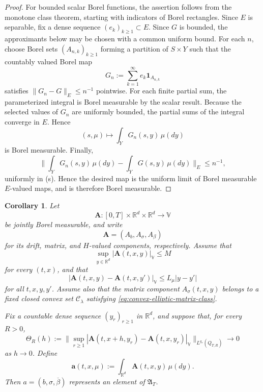 \documentclass[12pt,oneside, reqno]{amsart}
\newtheorem{corollary}[theorem]{Corollary}
\numberwithin{equation}{section}
\begin{document}
	\begin{proof}
		For bounded scalar Borel functions, the assertion follows from the monotone
		class theorem, starting with indicators of Borel rectangles. Since \(E\) is
		separable, fix a dense sequence \((e_k)_{k\geq1}\subset E\). Since \(G\)
		is bounded, the approximants below may be chosen with a common uniform
		bound. For each \(n\), choose Borel sets
		\((A_{n,k})_{k\geq1}\) forming a partition of \(S\times Y\) such that the
		countably valued Borel map
		\[
		G_n:=\sum_{k=1}^{\infty}e_k\mathbf1_{A_{n,k}}
		\]
		satisfies \(\|G_n-G\|_E\leq n^{-1}\) pointwise. For each finite partial
		sum, the parameterized integral is Borel measurable by the scalar result.
		Because the selected values of \(G_n\) are uniformly bounded, the partial
		sums of the integral converge in \(E\). Hence
		\[
		(s,\mu)\longmapsto\int_YG_n(s,y)\,\mu(dy)
		\]
		is Borel measurable. Finally,
		\[
		\big\|
		\int_YG_n(s,y)\,\mu(dy)
		-
		\int_YG(s,y)\,\mu(dy)
		\big\|_E
		\leq n^{-1},
		\]
		uniformly in (s). Hence the desired map is the uniform limit of
		Borel measurable \(E\)-valued maps, and is therefore Borel measurable.
	\end{proof}
	
	\begin{corollary}
		\label{cor:integral-interaction-completion}
		Let
		\[
		\mathbf A:
		[0,T]\times\mathbb R^d\times\mathbb R^d
		\longrightarrow\mathbb V
		\]
		be jointly Borel measurable, and write
		\[
		\mathbf A=(A_b,A_\sigma,A_\beta)
		\]
		for its drift, matrix, and $H$-valued components, respectively. Assume that
		\begin{equation}
			\label{eq:integral-interaction-uniform-bound}
			\sup_{y\in\mathbb R^d}
			|\mathbf A(t,x,y)|_{\mathbb V}
			\leq M
		\end{equation}
		for every \((t,x)\), and that
		\begin{equation}
			\label{eq:kernel-law-lipschitz}
			|\mathbf A(t,x,y)-\mathbf A(t,x,y')|_{\mathbb V}
			\leq
			L_\mu|y-y'|
		\end{equation}
		for all \(t,x,y,y'\). Assume also that the matrix component
		\(A_\sigma(t,x,y)\) belongs to a fixed closed convex set
		\(\mathcal C_\lambda\) satisfying
		\eqref{eq:convex-elliptic-matrix-class}.
		
		Fix a countable dense sequence \((y_r)_{r\geq1}\) in \(\mathbb R^d\), and
		suppose that, for every \(R>0\),
		\begin{equation}
			\label{eq:kernel-uniform-spatial-translation}
			\Theta_R(h)
			:=
			\big\|
			\sup_{r\geq1}
			|\mathbf A(t,x+h,y_r)-\mathbf A(t,x,y_r)|_{\mathbb V}
			\big\|_{L^{q_\ast}(Q_{T,R})}
			\longrightarrow0
		\end{equation}
		as \(h\to0\). Define
		\begin{equation}
			\label{eq:integral-interaction-coefficient}
			\mathbf a(t,x,\mu)	:=	\int_{\mathbb R^d}\mathbf A(t,x,y)\,\mu(dy).
		\end{equation}
		Then \(a=(b,\sigma,\overline\beta)\) represents an element of \(\mathfrak A_T\).
	\end{corollary}
	
\end{document}
